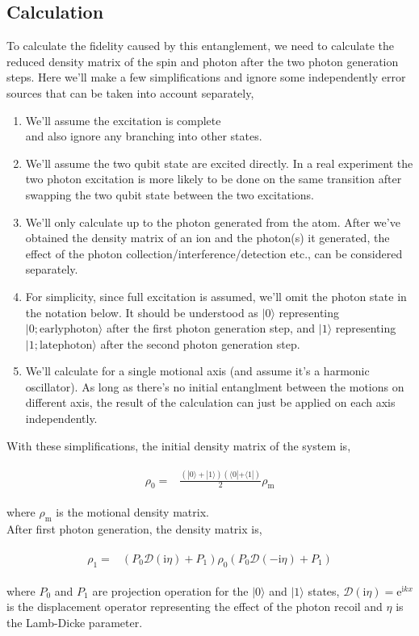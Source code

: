 \documentclass[10pt,fleqn]{article}
\newcommand{\ue}{\mathrm{e}}
\newcommand{\ui}{\mathrm{i}}
\newcommand{\eqar}[1]
{
  \begin{align}
    #1
  \end{align}
}
\newcommand{\paren}[1]{{\left({#1}\right)}}
\begin{document}
\subsection{Calculation}

To calculate the fidelity caused by this entanglement, we need to calculate
the reduced density matrix of the spin and photon after the two photon generation steps.
Here we'll make a few simplifications and ignore some independently error sources
that can be taken into account separately,
\begin{enumerate}
\item We'll assume the excitation is complete\\
  and also ignore any branching into other states.
\item We'll assume the two qubit state are excited directly.
  In a real experiment the two photon excitation is more likely to be done
  on the same transition after swapping the two qubit state between the two excitations.
\item We'll only calculate up to the photon generated from the atom.
  After we've obtained the density matrix of an ion and the photon(s) it generated,
  the effect of the photon collection/interference/detection etc.,
  can be considered separately.
\item For simplicity, since full excitation is assumed,
  we'll omit the photon state in the notation below. It should be understood as
  $|0\rangle$ representing $|0;\mathrm{early photon}\rangle$ after the first photon
  generation step, and $|1\rangle$ representing $|1;\mathrm{late photon}\rangle$
  after the second photon generation step.
\item We'll calculate for a single motional axis
  (and assume it's a harmonic oscillator).
  As long as there's no initial entanglment between the motions on different axis,
  the result of the calculation can just be applied on each axis independently.
\end{enumerate}

With these simplifications, the initial density matrix of the system is,
\eqar{
  \begin{split}
    \rho_0=&\frac{\paren{|0\rangle+|1\rangle}\paren{\langle0|+\langle1|}}{2}\rho_{\mathrm{m}}
  \end{split}
}
where $\rho_{\mathrm{m}}$ is the motional density matrix.\\

After first photon generation, the density matrix is,
\eqar{
  \begin{split}
    \rho_1=&\paren{P_{0}\mathcal{D}(\ui\eta)+P_{1}}\rho_0\paren{P_{0}\mathcal{D}(-\ui\eta)+P_{1}}
  \end{split}
}
where $P_0$ and $P_1$ are projection operation for the $|0\rangle$
and $|1\rangle$ states, $\mathcal{D}(\ui\eta)=\ue^{\ui kx}$ is the displacement operator
representing the effect of the photon recoil and $\eta$ is the Lamb-Dicke parameter.\\
\end{document}
